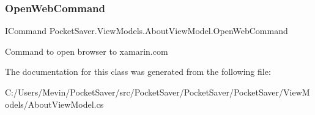 \subsubsection{\texorpdfstring{Open\+Web\+Command}{OpenWebCommand}}
{\footnotesize\ttfamily I\+Command Pocket\+Saver.\+View\+Models.\+About\+View\+Model.\+Open\+Web\+Command\hspace{0.3cm}{\ttfamily [get]}}



Command to open browser to xamarin.\+com 



The documentation for this class was generated from the following file\+:\begin{DoxyCompactItemize}
\item 
C\+:/\+Users/\+Mevin/\+Pocket\+Saver/src/\+Pocket\+Saver/\+Pocket\+Saver/\+Pocket\+Saver/\+View\+Models/About\+View\+Model.\+cs\end{DoxyCompactItemize}
